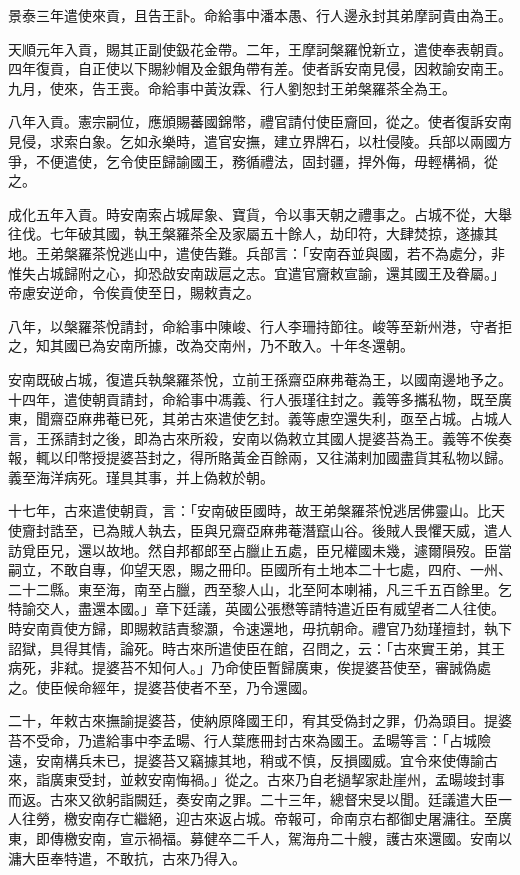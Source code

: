 \begin{pinyinscope}
景泰三年遣使來貢，且告王訃。命給事中潘本愚、行人邊永封其弟摩訶貴由為王。

天順元年入貢，賜其正副使鈒花金帶。二年，王摩訶槃羅悅新立，遣使奉表朝貢。四年復貢，自正使以下賜紗帽及金銀角帶有差。使者訴安南見侵，因敕諭安南王。九月，使來，告王喪。命給事中黃汝霖、行人劉恕封王弟槃羅茶全為王。

八年入貢。憲宗嗣位，應頒賜蕃國錦幣，禮官請付使臣齎回，從之。使者復訴安南見侵，求索白象。乞如永樂時，遣官安撫，建立界牌石，以杜侵陵。兵部以兩國方爭，不便遣使，乞令使臣歸諭國王，務循禮法，固封疆，捍外侮，毋輕構禍，從之。

成化五年入貢。時安南索占城犀象、寶貨，令以事天朝之禮事之。占城不從，大舉往伐。七年破其國，執王槃羅茶全及家屬五十餘人，劫印符，大肆焚掠，遂據其地。王弟槃羅茶悅逃山中，遣使告難。兵部言：「安南吞並與國，若不為處分，非惟失占城歸附之心，抑恐啟安南跋扈之志。宜遣官齎敕宣諭，還其國王及眷屬。」帝慮安逆命，令俟貢使至日，賜敕責之。

八年，以槃羅茶悅請封，命給事中陳峻、行人李珊持節往。峻等至新州港，守者拒之，知其國已為安南所據，改為交南州，乃不敢入。十年冬還朝。

安南既破占城，復遣兵執槃羅茶悅，立前王孫齋亞麻弗菴為王，以國南邊地予之。十四年，遣使朝貢請封，命給事中馮義、行人張瑾往封之。義等多攜私物，既至廣東，聞齋亞麻弗菴已死，其弟古來遣使乞封。義等慮空還失利，亟至占城。占城人言，王孫請封之後，即為古來所殺，安南以偽敕立其國人提婆苔為王。義等不俟奏報，輒以印幣授提婆苔封之，得所賂黃金百餘兩，又往滿剌加國盡貨其私物以歸。義至海洋病死。瑾具其事，并上偽敕於朝。

十七年，古來遣使朝貢，言：「安南破臣國時，故王弟槃羅茶悅逃居佛靈山。比天使齎封誥至，已為賊人執去，臣與兄齋亞麻弗菴潛竄山谷。後賊人畏懼天威，遣人訪覓臣兄，還以故地。然自邦都郎至占臘止五處，臣兄權國未幾，遽爾隕歿。臣當嗣立，不敢自專，仰望天恩，賜之冊印。臣國所有土地本二十七處，四府、一州、二十二縣。東至海，南至占臘，西至黎人山，北至阿本喇補，凡三千五百餘里。乞特諭交人，盡還本國。」章下廷議，英國公張懋等請特遣近臣有威望者二人往使。時安南貢使方歸，即賜敕詰責黎灝，令速還地，毋抗朝命。禮官乃劾瑾擅封，執下詔獄，具得其情，論死。時古來所遣使臣在館，召問之，云：「古來實王弟，其王病死，非弒。提婆苔不知何人。」乃命使臣暫歸廣東，俟提婆苔使至，審誠偽處之。使臣候命經年，提婆苔使者不至，乃令還國。

二十，年敕古來撫諭提婆苔，使納原降國王印，宥其受偽封之罪，仍為頭目。提婆苔不受命，乃遣給事中李孟暘、行人葉應冊封古來為國王。孟暘等言：「占城險遠，安南構兵未已，提婆苔又竊據其地，稍或不慎，反損國威。宜令來使傳諭古來，詣廣東受封，並敕安南悔禍。」從之。古來乃自老撾挈家赴崖州，孟暘竣封事而返。古來又欲躬詣闕廷，奏安南之罪。二十三年，總督宋旻以聞。廷議遣大臣一人往勞，檄安南存亡繼絕，迎古來返占城。帝報可，命南京右都御史屠滽往。至廣東，即傳檄安南，宣示禍福。募健卒二千人，駕海舟二十艘，護古來還國。安南以滽大臣奉特遣，不敢抗，古來乃得入。


\end{pinyinscope}
